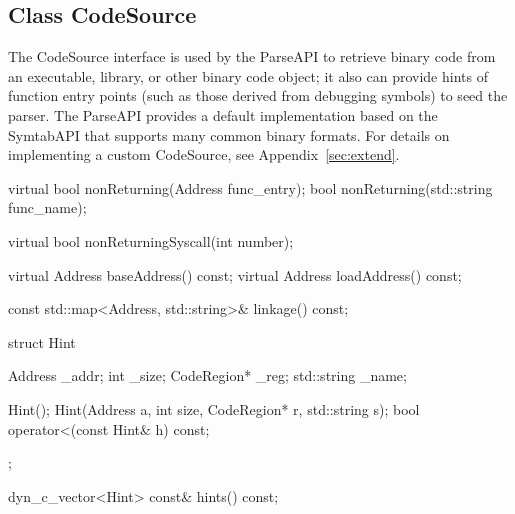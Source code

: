 \subsection{Class CodeSource}
\label{sec:codesource}


The CodeSource interface is used by the ParseAPI to retrieve binary code from
an executable, library, or other binary code object; it also can provide hints
of function entry points (such as those derived from debugging symbols) to seed
the parser. The ParseAPI provides a default implementation based on the
SymtabAPI that supports many common binary formats. For details on implementing
a custom CodeSource, see Appendix~\ref{sec:extend}.

\begin{apient}
virtual bool nonReturning(Address func_entry);
bool nonReturning(std::string func_name);
\end{apient}

\begin{apient}
virtual bool nonReturningSyscall(int number);
\end{apient}


\begin{apient}
virtual Address baseAddress() const;
virtual Address loadAddress() const;
\end{apient}

\begin{apient}
const std::map<Address, std::string>& linkage() const;
\end{apient}

\begin{apient}
struct Hint {
    Address _addr;
    int _size;
    CodeRegion* _reg;
    std::string _name;

    Hint();
    Hint(Address a, int size, CodeRegion* r, std::string s);
    bool operator<(const Hint& h) const;
};

dyn_c_vector<Hint> const& hints() const;
\end{apient}


